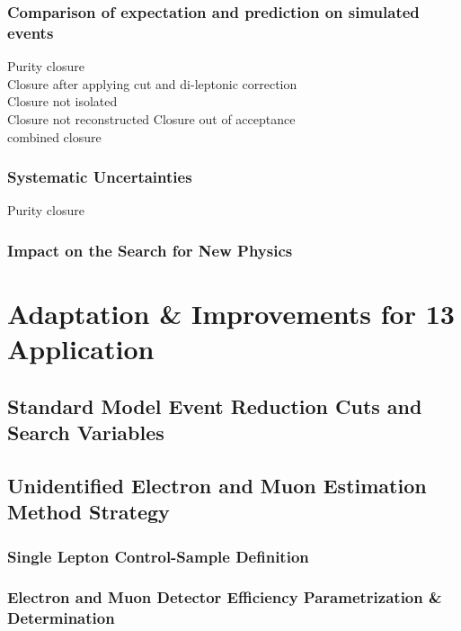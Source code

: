 \subsection{Comparison of expectation and prediction on simulated events}
\label{sec:Lost_Lepton_8TeV_Closure}
\todo Purity closure\\
\todo Closure after applying \mt cut and di-leptonic correction\\
\todo Closure not isolated\\
\todo Closure not reconstructed
\todo Closure out of acceptance\\
\todo combined closure\\

\subsection{Systematic Uncertainties}
\label{sec:Lost_Lepton_8TeV_Uncertainties}
\todo Purity closure\\

\subsection{Impact on the Search for New Physics}
\label{sec:Lost_Lepton_8TeV_Limits}

\chapter{Adaptation \& Improvements for 13 \tev Application}
\label{sec:Lost_Lepton_13TeV}
\section{Standard Model Event Reduction Cuts and Search Variables}
\label{sec:Lost_Lepton_13TeV_SearchStrategy}
\section{Unidentified Electron and Muon Estimation Method Strategy}
\label{sec:Lost_Lepton_13TeV_changes}
\subsection{Single Lepton Control-Sample Definition}
\label{sec:Lost_Lepton_13TeV_control_sample}
\subsection{Electron and Muon Detector Efficiency Parametrization \& Determination}
\label{sec:Lost_Lepton_13TeV_Efficiencies}
